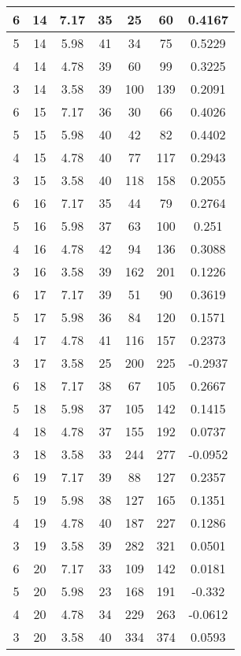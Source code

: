 \documentclass[letterpaper, 12pt]{article}
\begin{document}
\begin{longtable}{|c|c|c|c|c|c|c|}
\hline
6 & 14 & 7.17 & 35 & 25 & 60 & 0.4167 \\
\hline
5 & 14 & 5.98 & 41 & 34 & 75 & 0.5229 \\
\hline
4 & 14 & 4.78 & 39 & 60 & 99 & 0.3225 \\
\hline
3 & 14 & 3.58 & 39 & 100 & 139 & 0.2091 \\
\hline
6 & 15 & 7.17 & 36 & 30 & 66 & 0.4026 \\
\hline
5 & 15 & 5.98 & 40 & 42 & 82 & 0.4402 \\
\hline
4 & 15 & 4.78 & 40 & 77 & 117 & 0.2943 \\
\hline
3 & 15 & 3.58 & 40 & 118 & 158 & 0.2055 \\
\hline
6 & 16 & 7.17 & 35 & 44 & 79 & 0.2764 \\
\hline
5 & 16 & 5.98 & 37 & 63 & 100 & 0.251 \\
\hline
4 & 16 & 4.78 & 42 & 94 & 136 & 0.3088 \\
\hline
3 & 16 & 3.58 & 39 & 162 & 201 & 0.1226 \\
\hline
6 & 17 & 7.17 & 39 & 51 & 90 & 0.3619 \\
\hline
5 & 17 & 5.98 & 36 & 84 & 120 & 0.1571 \\
\hline
4 & 17 & 4.78 & 41 & 116 & 157 & 0.2373 \\
\hline
3 & 17 & 3.58 & 25 & 200 & 225 & -0.2937 \\
\hline
6 & 18 & 7.17 & 38 & 67 & 105 & 0.2667 \\
\hline
5 & 18 & 5.98 & 37 & 105 & 142 & 0.1415 \\
\hline
4 & 18 & 4.78 & 37 & 155 & 192 & 0.0737 \\
\hline
3 & 18 & 3.58 & 33 & 244 & 277 & -0.0952 \\
\hline
6 & 19 & 7.17 & 39 & 88 & 127 & 0.2357 \\
\hline
5 & 19 & 5.98 & 38 & 127 & 165 & 0.1351 \\
\hline
4 & 19 & 4.78 & 40 & 187 & 227 & 0.1286 \\
\hline
3 & 19 & 3.58 & 39 & 282 & 321 & 0.0501 \\
\hline
6 & 20 & 7.17 & 33 & 109 & 142 & 0.0181 \\
\hline
5 & 20 & 5.98 & 23 & 168 & 191 & -0.332 \\
\hline
4 & 20 & 4.78 & 34 & 229 & 263 & -0.0612 \\
\hline
3 & 20 & 3.58 & 40 & 334 & 374 & 0.0593 \\
\hline
\end{longtable}
\end{document}
